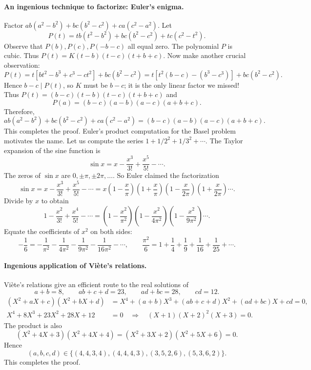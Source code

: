 \documentclass[11pt,a4paper]{article}
\begin{document}
\paragraph{An ingenious technique to factorize: Euler's enigma.}
Factor $ab(a^2-b^2)+bc(b^2-c^2)+ca(c^2-a^2)$.
Let
\[P(t)=tb(t^2-b^2)+bc(b^2-c^2)+tc(c^2-t^2).\]
Observe that $P(b),P(c),P(-b-c)$ all equal zero. The polynomial $P$ is cubic.
Thus $P(t)=K(t-b)(t-c)(t+b+c)$.
Now make another crucial observation:
\[
P(t)=t[bt^2-b^3+c^3-ct^2]+bc(b^2-c^2)
=t[t^2(b-c)-(b^3-c^3)]+bc(b^2-c^2).
\]
Hence $b-c\mid P(t)$, so $K$ must be $b-c$; it is the only linear factor we missed!
Thus $P(t)=(b-c)(t-b)(t-c)(t+b+c)$ and
\[
P(a)=(b-c)(a-b)(a-c)(a+b+c).
\]
Therefore,
\[ab(a^2-b^2)+bc(b^2-c^2)+ca(c^2-a^2)
=(b-c)(a-b)(a-c)(a+b+c).\]
This completes the proof.
Euler's product computation for the Basel problem motivates the name.
Let us compute the series $1+1/2^2+1/3^2+\cdots$.
The Taylor expansion of the sine function is
\[\sin x=x-\frac{x^3}{3!}+\frac{x^5}{5!}-\cdots.\]
The zeros of $\sin x$ are $0,\pm\pi,\pm2\pi,\ldots$.
So Euler claimed the factorization
\[\sin x=x-\frac{x^3}{3!}+\frac{x^5}{5!}-\cdots
=x\left(1-\frac x\pi\right)\left(1+\frac x\pi\right)
\left(1-\frac x{2\pi}\right)\left(1+\frac x{2\pi}\right)\cdots.\]
Divide by $x$ to obtain
\[1-\frac{x^2}{3!}+\frac{x^4}{5!}-\cdots
=\left(1-\frac{x^2}{\pi^2}\right)\left(1-\frac{x^2}{4\pi^2}\right)
\left(1-\frac{x^2}{9\pi^2}\right)\cdots.\]
Equate the coefficients of $x^2$ on both sides:
\[-\frac16=-\frac1{\pi^2}-\frac1{4\pi^2}-\frac1{9\pi^2}-\frac1{16\pi^2}-\cdots,
\qquad \frac{\pi^2}{6}=1+\frac14+\frac19+\frac1{16}+\frac1{25}+\cdots.\]

\paragraph{Ingenious application of Vi\`ete's relations.}
Vi\`ete's relations give an efficient route to the real solutions of
\[a+b=8,\qquad ab+c+d=23,\qquad ad+bc=28,\qquad cd=12.\]
\[
\begin{aligned}
(X^2+aX+c)(X^2+bX+d)
&=X^4+(a+b)X^3+(ab+c+d)X^2+(ad+bc)X+cd=0,\\
X^4+8X^3+23X^2+28X+12&=0
\quad\Longrightarrow\quad (X+1)(X+2)^2(X+3)=0.
\end{aligned}
\]
The product is also
\[(X^2+4X+3)(X^2+4X+4)=(X^2+3X+2)(X^2+5X+6)=0.\]
Hence
\[(a,b,c,d)\in\{(4,4,3,4),(4,4,4,3),(3,5,2,6),(5,3,6,2)\}.\]
This completes the proof.
\end{document}

